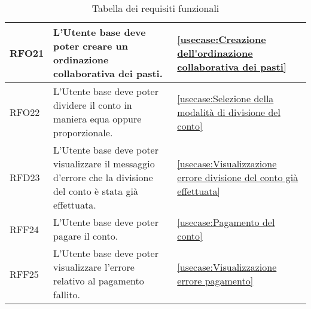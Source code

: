 \begin{table}[H]
\begin{tabularx}{\textwidth}{l|X|p{2cm}}
		\hline
		RFO21       & L'Utente base deve poter creare un ordinazione collaborativa dei pasti.                                        & \autoref{usecase:Creazione dell'ordinazione collaborativa dei pasti}                                               \\
		\hline
		RFO22       & L'Utente base deve poter dividere il conto in maniera equa oppure proporzionale.                               & \autoref{usecase:Selezione della modalità di divisione del conto}                                                  \\
		\hline
		RFD23       & L'Utente base deve poter visualizzare il messaggio d'errore che la divisione del conto è stata già effettuata. & \autoref{usecase:Visualizzazione errore divisione del conto già effettuata}                                        \\
		\hline
		RFF24       & L'Utente base deve poter pagare il conto.                                                                      & \autoref{usecase:Pagamento del conto}                                                                              \\
		\hline
		RFF25       & L'Utente base deve poter visualizzare l'errore relativo al pagamento fallito.                                  & \autoref{usecase:Visualizzazione errore pagamento}                                                                 \\
	\end{tabularx}
	\caption{Tabella dei requisiti funzionali}
\end{table}


